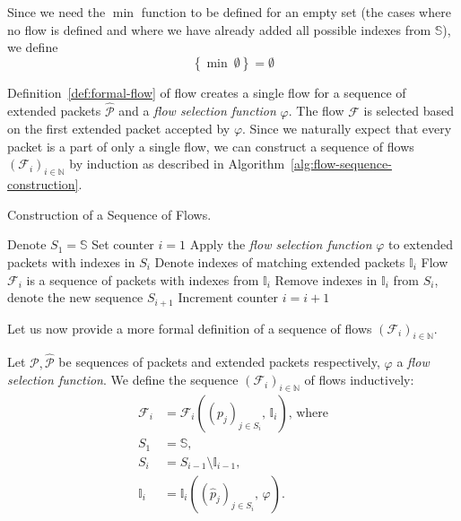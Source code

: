 Since we need the $\min$ function to be defined for an empty set (the cases where no flow is defined and where we have already added all possible indexes from $\mathbb{S}$), we define
\begin{equation*}
    \left\{\min\ \emptyset \right\} = \emptyset
\end{equation*}

Definition~\ref{def:formal-flow} of flow creates a single flow for a sequence of extended packets $\widehat{\mathcal{P}}$ and a \emph{flow selection function} $\varphi$. The flow $\mathcal{F}$ is selected based on the first extended packet accepted by $\varphi$. Since we naturally expect that every packet is a part of only a single flow, we can construct a sequence of flows $(\mathcal{F}_i)_{i \in \mathbb{N}}$ by induction as described in Algorithm~\ref{alg:flow-sequence-construction}.

\begin{algorithm}
    \caption{Construction of a Sequence of Flows.}
    \label{alg:flow-sequence-construction}
    \begin{algorithmic}[1]
        \STATE Denote $S_1 = \mathbb{S}$
        \STATE Set counter $i = 1$
        \REPEAT
            \STATE Apply the \emph{flow selection function} $\varphi$ to extended packets with indexes in $S_i$
            \STATE Denote indexes of matching extended packets $\mathbb{I}_i$
            \STATE Flow $\mathcal{F}_i $ is a sequence of packets with indexes from $\mathbb{I}_i$
            \STATE Remove indexes in $\mathbb{I}_i$ from $S_i$, denote the new sequence $S_{i+1}$
            \STATE Increment counter $i = i + 1$
    \end{algorithmic}
\end{algorithm}

Let us now provide a more formal definition of a sequence of flows $(\mathcal{F}_i)_{i \in \mathbb{N}}$.
\begin{defn}\label{def:formal-flow-sequence}
Let $\mathcal{P}, \widehat{\mathcal{P}}$ be sequences of packets and extended packets respectively, $\varphi$ a \emph{flow selection function}. We define the sequence $(\mathcal{F}_i)_{i \in \mathbb{N}}$ of flows inductively:
\begin{align*}
    \mathcal{F}_i &= \mathcal{F}_i\left((p_j)_{j\in S_i},\, \mathbb{I}_i\right) \text{, where} \\
    S_1 &= \mathbb{S}, \\
    S_i &= S_{i-1} \setminus \mathbb{I}_{i-1}, \\
    \mathbb{I}_{i} &= \mathbb{I}_i\left((\widehat{p}_j)_{j \in S_i},\, \varphi\right).
\end{align*}
\end{defn}

